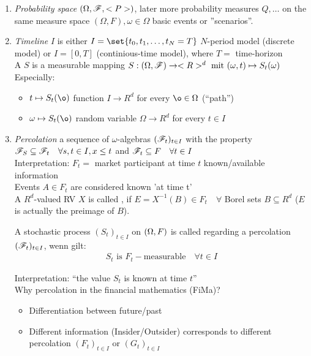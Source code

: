\begin{enumerate}
	\item \emph{Probability space} $(\Omega,\mathscr F,<P>)$, later more probability measures $Q, \dots$ on the same measure space $(\Omega,F), \omega \in \Omega$ basic events or ''scenarios''.
	
	\newpage
	\item \emph{Timeline} $I$ is either $I=\set{t_0, t_1, \dots, t_N=T}$ $N$-period model (discrete model) or $I = [0,T]$ (continious-time model), where $T = $ time-horizon\\
	
	A  $S$ is a measurable mapping $S: (\Omega,\mathscr F) \to <R>^d \text{ mit } (\omega, t) \mapsto S_t(\omega)$\\
	Especially:
	\begin{itemize}
		\item $t \mapsto S_t(\o)$ function $I \to R^d$ for every $\o \in \O$ (``path'')
		\item $\omega \mapsto S_t(\o)$ random variable $\Omega \to R^d$ for every $t \in I$
	\end{itemize}
	\item \emph{Percolation} 
	a sequence of $\omega$-algebras $(\mathscr F_t)_{t \in I}$ with the property $\mathscr F_S \subseteq \mathscr F_t \quad \forall s,t \in I, x \le t$ and $\mathscr F_t \subseteq F\quad \forall t \in I$\\
	Interpretation: $F_t=$ market participant at time $t$ known/available information\\
	Events $A \in F_t$ are considered known 'at time t'\\
	A $R^d$-valued RV $X$ is called  , if $E = X^{-1}(B) \in F_t \quad \forall$ Borel sets $B \subseteq R^d$ ($E$ is actually the preimage of $B$).
	\begin{*example}
		A stochastic process  $(S_t)_{t\in I}$ on $(\Omega,F)$ is called  regarding a percolation $(\mathscr F_t)_{t \in I}$, wenn gilt:
		\begin{align*}
			S_t \text{ is } F_t-\text{measurable} \quad \forall t \in I
		\end{align*}
	\end{*example}
	Interpretation: ``the value $S_t$ is known at time $t$''\\
	Why percolation in the financial mathematics (FiMa)?
	\begin{itemize}
		\item Differentiation between future/past
		\item Different information (Insider/Outsider) corresponds to different percolation $(F_t)_{t \in I}$ or $(G_t)_{t\in I}$

\end{itemize}
\end{enumerate}
